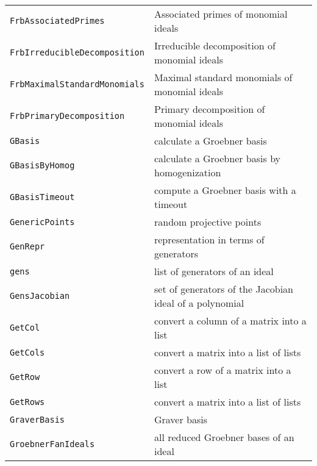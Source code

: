 \documentclass[a4paper]{mybook}
\begin{document}
\begin{center}
\begin{longtable}{ll}
{\verb~FrbAssociatedPrimes~} &
      Associated primes of monomial ideals\\
   
{\verb~FrbIrreducibleDecomposition~} &
      Irreducible decomposition of monomial ideals\\
   
{\verb~FrbMaximalStandardMonomials~} &
      Maximal standard monomials of monomial ideals\\
   
{\verb~FrbPrimaryDecomposition~} &
      Primary decomposition of monomial ideals\\
   
{\verb~GBasis~} &
      calculate a Groebner basis\\
   
{\verb~GBasisByHomog~} &
      calculate a Groebner basis by homogenization\\
   
{\verb~GBasisTimeout~} &
      compute a Groebner basis with a timeout\\
   
{\verb~GenericPoints~} &
      random projective points\\
   
{\verb~GenRepr~} &
      representation in terms of generators\\
   
{\verb~gens~} &
      list of generators of an ideal\\
   
{\verb~GensJacobian~} &
      set of generators of the Jacobian ideal of a polynomial\\
   
{\verb~GetCol~} &
      convert a column of a matrix into a list\\
   
{\verb~GetCols~} &
      convert a matrix into a list of lists\\
   
{\verb~GetRow~} &
      convert a row of a matrix into a list\\
   
{\verb~GetRows~} &
      convert a matrix into a list of lists\\
   
{\verb~GraverBasis~} &
      Graver basis\\
   
{\verb~GroebnerFanIdeals~} &
      all reduced Groebner bases of an ideal\\
   

\end{longtable}
\end{center}
\end{document}
